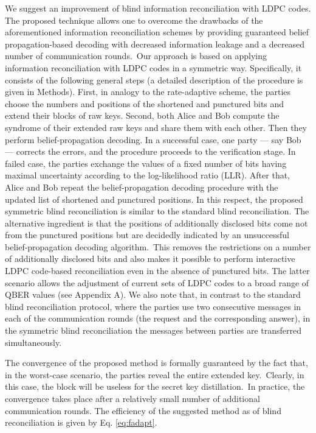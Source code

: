 \documentclass[aps,pra,twocolumn,amsmath,amssymb,nofootinbib,showpacs,superscriptaddress]{revtex4-1}
\begin{document}
We suggest an improvement of blind information reconciliation with LDPC codes.
The proposed technique allows one to overcome the drawbacks of the aforementioned information reconciliation schemes 
by providing guaranteed belief propagation-based decoding with decreased information leakage and a decreased number of communication rounds.~Our approach is based on applying
information reconciliation with LDPC codes in a symmetric way. 
Specifically, it consists of the following general steps 
(a detailed description of the procedure is given in Methods).
First, in analogy to the rate-adaptive scheme, the parties choose the numbers and positions of the shortened and punctured bits and extend their blocks of raw keys.
Second, both Alice and Bob compute the syndrome of their extended raw keys and share them with each other.
Then they perform belief-propagation decoding. 
In a successful case, one party --- say Bob --- corrects the errors, and the procedure proceeds to the verification stage. 
In failed case, the parties exchange the values of a fixed number of bits having maximal uncertainty according to the log-likelihood ratio (LLR).  
After that, Alice and Bob repeat the belief-propagation decoding procedure with the updated list of shortened and punctured positions. 
In this respect, the proposed symmetric blind reconciliation is similar to the standard blind reconciliation.
The alternative ingredient is that the positions of additionally disclosed bits come not from the punctured positions but are decidedly indicated by an unsuccessful belief-propagation decoding algorithm.~This removes the restrictions on a number of additionally disclosed bits and also makes it possible to perform interactive LDPC code-based reconciliation even in the absence of punctured bits.
The latter scenario allows the adjustment of current sets of LDPC codes to a broad range of QBER values (see Appendix A).
We also note that, in contrast to the standard blind reconciliation protocol, 
where the parties use two consecutive messages in each of the communication rounds (the request and the corresponding answer), 
in the symmetric blind reconciliation the messages between parties are transferred simultaneously.

The convergence of the proposed method is formally guaranteed by the fact that, in the worst-case scenario, the parties reveal the entire extended key.~Clearly, in this case, the block will be useless for the secret key distillation.~In practice, the convergence takes place after a relatively small number of additional communication rounds.
The efficiency of the suggested method as of blind reconciliation is given by Eq. \eqref{eq:fadapt}.
\end{document}
